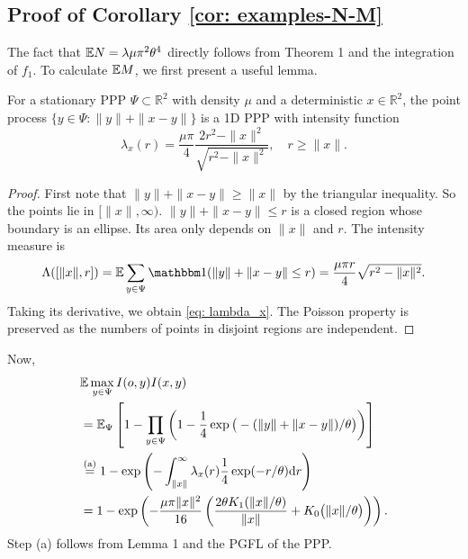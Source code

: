 \subsection{Proof of Corollary \ref{cor: examples-N-M}}
\label{appendix: examples-N-M}
The fact that $\mathbb{E} N = \lambda\mu {\pi^2}{\theta^4}$ directly follows from Theorem 1 and the integration of $f_1$.  To calculate $\mathbb{E} M$, we first present a useful lemma.      \begin{lemma}
For a stationary PPP $\Psi\subset \mathbb{R}^2$ with density $\mu$ and a deterministic $x\in\mathbb{R}^2$, the point process $\{y\in\Psi: \|y\|+\|x-y\|\}$ is a 1D PPP with intensity function
\begin{equation}
\lambda_x(r) = \frac{\mu\pi}{4}\frac{ 2r^2-\|x\|^2}{\sqrt{r^2-\|x\|^2}}, \quad r\geq \|x\|.    
\label{eq: lambda_x}
\end{equation}
   \end{lemma}
   \begin{proof}
   First note that $\|y\|+\|x-y\|\geq\|x\|$ by the triangular inequality. So the points lie in $[\|x\|,\infty)$. $\|y\|+\|x-y\|\leq r$ is a closed region whose boundary is an ellipse. Its area only depends on $\|x\|$ and $r$. The intensity measure is
  \[\Lambda([\|x\|,r])= \Ex \sum_{y\in\Psi} \ind(\|y\|+\|x-y\|\leq r) = \frac{\mu\pi r}{4}\sqrt{r^2-\|x\|^2}.\] 
  Taking its derivative, we obtain \eqref{eq: lambda_x}. The Poisson property is preserved as the numbers of points in disjoint regions are independent.
 \end{proof}


Now,
\begin{align}
  &\mathbb{E} \max_{y\in\Psi} I(o,y)I(x,y)\nonumber \\
     &=\mathbb{E}_{\Psi}\left[ 1- \prod_{y\in\Psi} \left(1-\frac{1}{4}\exp\big(- (\|y\|+\|x-y\|)/\theta\big)\right)\right]\nonumber\\
     &\stackrel{\text{\scriptsize(a)}}{=} 1-\exp\left(-\int_{\|x\|}^{\infty} \lambda_{x}(r) \frac{1}{4}\exp(-r/\theta)\mathrm{d} r\right)\nonumber\\
     &=1-\exp\left(-\frac{\mu\pi \|x\|^2}{16}\left(\frac{2\theta K_1(\|x\|/\theta )}{ \|x\|}+K_0\big( \|x\|/\theta \big)\right)\right)\nonumber.
   \end{align}
    Step (a) follows from Lemma 1 and the PGFL of the PPP.

\printbibliography
